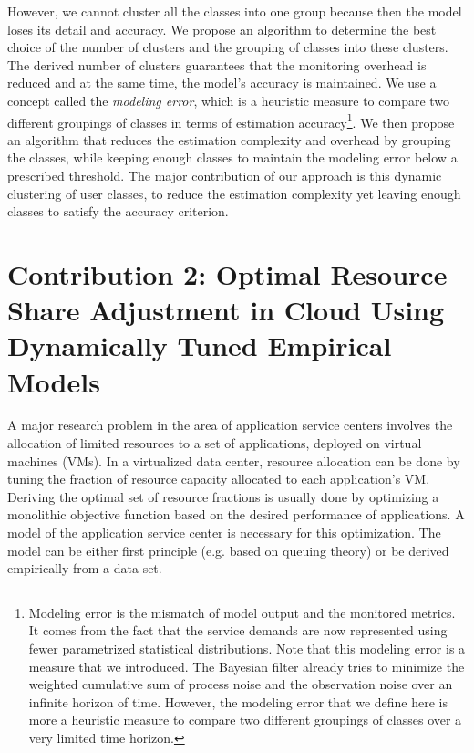  However, we cannot cluster all the classes into one group  because then the model loses its detail and accuracy. 
We propose an algorithm to determine the best choice of the number of clusters and the grouping of classes into these clusters.
The derived number of clusters guarantees that the monitoring overhead is reduced and at the same time, the model's accuracy is maintained. 
We use a concept called the \textit{modeling error}, which is a heuristic measure to compare two different groupings of classes in terms of estimation accuracy\footnote{Modeling error is the mismatch of model output and the monitored metrics. It comes from the fact that the service demands are now represented using fewer parametrized statistical distributions. Note that this modeling error is a measure that we introduced. 
The Bayesian filter already tries to minimize the weighted cumulative sum of process noise and the observation noise over an infinite horizon of time. However, the modeling error that we define here is more a heuristic measure to compare two different groupings of classes over a very limited time horizon. }.
We then propose an algorithm  that reduces the estimation complexity and overhead by grouping the classes, while keeping enough classes to  maintain the modeling error below a prescribed threshold. The major contribution of our approach is this dynamic clustering of user classes, to reduce the estimation complexity yet leaving enough classes to satisfy the accuracy criterion.  


 \section{Contribution 2: Optimal Resource Share Adjustment in Cloud Using Dynamically Tuned Empirical Models}    
\label{optimization_no_reconfiguration_cost} 
 A major research problem in the area of application service centers involves the allocation of limited resources to a set of applications, deployed on virtual machines (VMs). In a virtualized data center, resource allocation can be done by tuning the fraction of resource capacity allocated to each application's VM. 
Deriving the optimal set of resource fractions is usually done by optimizing a monolithic objective function based on the desired performance of applications. A model of the application service center is necessary for this optimization. The model can be either first principle (e.g. based on queuing theory) or be derived empirically from a data set.
 
